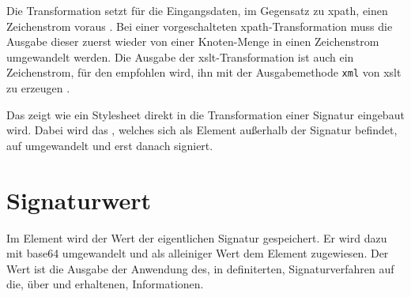 Die Transformation setzt für die Eingangsdaten, im Gegensatz zu \gls{xpath}, einen Zeichenstrom voraus \cite{xml-dsig:w3c}. Bei einer vorgeschalteten
\gls{xpath}-Transformation muss die Ausgabe dieser zuerst wieder von einer Knoten-Menge in einen Zeichenstrom umgewandelt werden. Die Ausgabe der
\gls{xslt}-Transformation ist auch ein Zeichenstrom, für den empfohlen wird, ihn mit der Ausgabemethode \texttt{xml} von \gls{xslt} zu erzeugen \cite{xml-dsig:w3c}.

Das  zeigt wie ein Stylesheet direkt in die Transformation einer Signatur eingebaut wird. Dabei wird das 
, welches sich als Element außerhalb der Signatur befindet, auf  umgewandelt und erst danach signiert.

\section{Signaturwert}
Im Element  wird der Wert der eigentlichen Signatur gespeichert. Er wird dazu mit \gls{base64} umgewandelt und als alleiniger Wert dem
Element zugewiesen. Der Wert ist die Ausgabe der Anwendung des, in  definiterten, Signaturverfahren auf die, über  und
 erhaltenen, Informationen.



